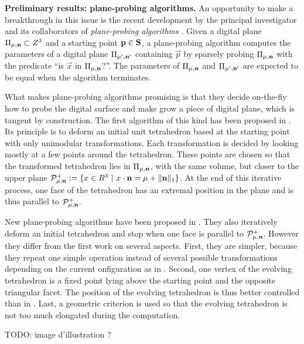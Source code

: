 \noindent\textbf{Preliminary results: plane-probing algorithms.}
An opportunity to make a breakthrough in this issue is the recent development
by the principal investigator and its collaborators of \emph{plane-probing
algorithms} \cite{LPRTCS2016, LPRDGCI2016, LPRJMIV2017}. 
Given a digital plane $\Pi_{\mu,\mathbf{n}} \subset Z^3$
and a starting point $\mathbf{p} \in \mathbf{S}$, 
a plane-probing algorithm computes the parameters of a digital plane $\Pi_{\mu',\mathbf{n}'}$
containing $\vec{p}$ by sparsely probing $\Pi_{\mu,\mathbf{n}}$ with the predicate
``is $\vec{x}$ in $\Pi_{\mu,\mathbf{n}}$?''. The parameters of $\Pi_{\mu,\mathbf{n}}$
and $\Pi_{\mu',\mathbf{n}'}$ are expected to be equal when the algorithm terminates.

What makes plane-probing algorithms promising is that they decide on-the-fly how
to probe the digital surface and make grow a piece of digital plane, which is
tangent by construction. 
The first algorithm of this kind has been proposed in \cite{LPRTCS2016}.
Its principle is to deform an initial unit tetrahedron based at the starting point
with only unimodular transformations. Each transformation is decided by looking
mostly at a few points around the tetrahedron. These points are chosen so that
the transformed tetrahedron lies in $\Pi_{\mu,\mathbf{n}}$, with the same volume,
but closer to the upper plane
$\mathcal{P}^{+}_{\mu,\mathbf{n}} := \{ x \in R^3 \ | \ x \cdot \mathbf{n} = \mu + \|\mathbf{n}\|_1 \}$.
At the end of this iterative process, one face of the tetrahedron has an extremal
position in the plane and is thus parallel to $\mathcal{P}^{+}_{\mu,\mathbf{n}}$.

New plane-probing algorithms have been proposed in \cite{LPRDGCI2016, LPRJMIV2017}. 
They also iteratively deform an initial tetrahedron and stop when one face is
parallel to $\mathcal{P}^{+}_{\mu,\mathbf{n}}$. 
However they differ from the first work on several aspects.  %
First, they are simpler, because they repeat one simple operation instead
of several possible transformations depending on the current onfiguration
as in \cite{LPRTCS2016}.  
Second, one vertex of the evolving tetrahedron is a fixed point lying above the 
starting point and the opposite triangular facet. The position of the evolving 
tetrahedron is thus better controlled than in \cite{LPRTCS2016}. 
Last, a geometric criterion is used so that the evolving tetrahedron is not
too much elongated during the computation.  

TODO: image d'illustration ?

